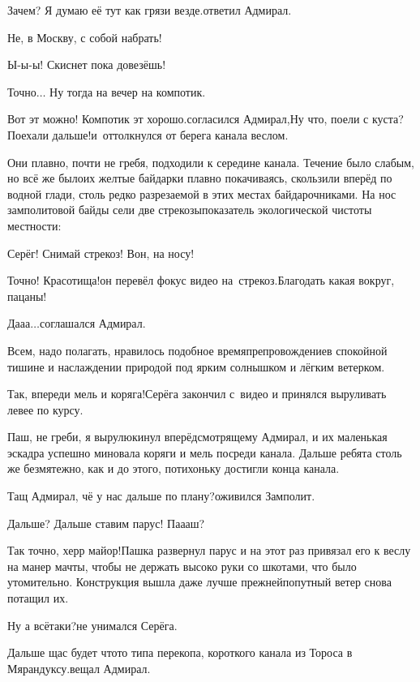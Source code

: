 \diagdash Зачем? Я думаю её тут как грязи везде.\mdash ответил Адмирал.

\diagdash Не, в Москву, с собой набрать!

\diagdash Ы-ы-ы! Скиснет пока довезёшь!

\diagdash Точно$\ldots$ Ну тогда на вечер на компотик.

\diagdash Вот эт можно! Компотик эт хорошо.\mdash согласился Адмирал,\mdash Ну что, поели с куста? Поехали дальше!\mdash и~оттолкнулся от берега канала веслом.

Они плавно, почти не гребя, подходили к середине канала. Течение было слабым, но всё же было\mdash их желтые байдарки плавно покачиваясь, скользили вперёд по водной глади, столь редко разрезаемой в этих местах байдарочниками. На нос замполитовой байды сели две стрекозы\mdash показатель экологической чистоты местности:

\diagdash Серёг! Снимай стрекоз! Вон, на носу!

\diagdash Точно! Красотища!\mdash он перевёл фокус видео на~стрекоз.\mdash Благодать какая вокруг, пацаны!

\diagdash Да\sdash а\sdash а$\ldots$\mdash соглашался Адмирал.

Всем, надо полагать, нравилось подобное времяпрепровождение\mdash в спокойной тишине и наслаждении природой под ярким солнышком и лёгким ветерком. 

\diagdash Так, впереди мель и коряга!\mdash Серёга закончил с~видео и принялся выруливать левее по курсу. 

\diagdash Паш, не греби, я вырулю\mdash кинул вперёдсмотрящему Адмирал, и их маленькая эскадра успешно миновала коряги и мель посреди канала. Дальше ребята столь же безмятежно, как и до этого, потихоньку достигли конца канала.

\diagdash Тащ Адмирал, чё у нас дальше по плану?\mdash оживился Замполит.

\diagdash Дальше? Дальше ставим парус! П\sdash а\sdash а\sdash аш?

\diagdash Так точно, херр майор!\mdash Пашка развернул парус и на этот раз привязал его к веслу на манер мачты, чтобы не держать высоко руки со шкотами, что было утомительно. Конструкция вышла даже лучше прежней\mdash попутный ветер снова потащил их. 

\diagdash Ну а всё\sdash таки?\mdash не унимался Серёга.

\diagdash Дальше щас будет что\sdash то типа перекопа, короткого канала из Тороса в Мярандуксу.\mdash вещал Адмирал.

